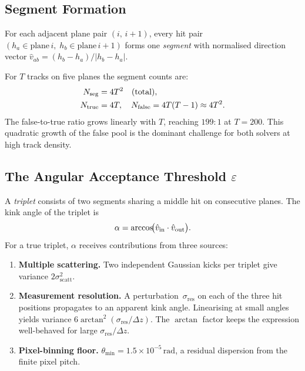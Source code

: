 \documentclass[11pt,a4paper]{article}
\newcommand{\sres}{\sigma_{\mathrm{res}}}
\newcommand{\sscat}{\sigma_{\mathrm{scatt}}}
\newcommand{\thmin}{\theta_{\min}}
\newcommand{\Dz}{\Delta z}
\newcommand{\Nseg}{N_{\mathrm{seg}}}
\newcommand{\ntrk}{T}
\begin{document}
\subsection{Segment Formation}
\label{sec:theory:segs}

For each adjacent plane pair $(i,\,i{+}1)$, every hit pair
$(h_a\!\in\!\text{plane}\,i,\;h_b\!\in\!\text{plane}\,i{+}1)$ forms one
\emph{segment} with normalised direction vector
$\hat{v}_{ab}=(h_b-h_a)/|h_b-h_a|$.

For $\ntrk$ tracks on five planes the segment counts are:
\begin{align}
  \Nseg &= 4\ntrk^2 \quad\text{(total)},\\
  N_{\rm true} &= 4\ntrk,\quad N_{\rm false} = 4\ntrk(\ntrk-1)\approx 4\ntrk^2.
\end{align}
The false-to-true ratio grows linearly with $\ntrk$, reaching $199:1$ at $\ntrk=200$.
This quadratic growth of the false pool is the dominant challenge for both solvers at
high track density.

\subsection{The Angular Acceptance Threshold $\varepsilon$}
\label{sec:theory:eps}

A \emph{triplet} consists of two segments sharing a middle hit on consecutive planes.
The kink angle of the triplet is
\begin{equation}
  \alpha = \arccos\!\bigl(\hat{v}_{\rm in}\cdot\hat{v}_{\rm out}\bigr).
\end{equation}
For a true triplet, $\alpha$ receives contributions from three sources:

\begin{enumerate}
  \item \textbf{Multiple scattering.}
        Two independent Gaussian kicks per triplet give variance $2\sscat^2$.

  \item \textbf{Measurement resolution.}
        A perturbation~$\sres$ on each of the three hit positions propagates to an
        apparent kink angle.  Linearising at small angles yields variance
        $6\arctan^2\!\!\left(\sres/\Dz\right)$.  The $\arctan$ factor keeps the
        expression well-behaved for large $\sres/\Dz$.

  \item \textbf{Pixel-binning floor.}
        $\thmin=1.5\times10^{-5}\,\mathrm{rad}$, a residual dispersion from the
        finite pixel pitch.
\end{enumerate}
\end{document}
